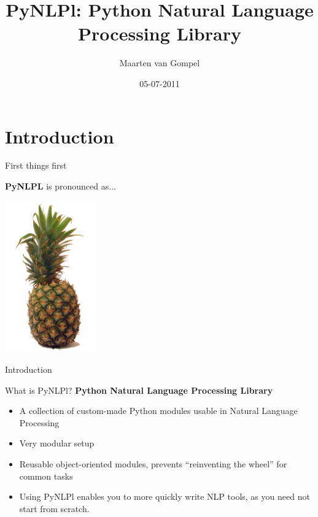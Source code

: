 \documentclass[compress]{beamer}
\title{PyNLPl: Python Natural Language Processing Library}
\author{Maarten van Gompel}
\date{05-07-2011}
\begin{document}
\begin{frame}
	\titlepage\smallraccoon\ilkuvt
\end{frame}

\section{Introduction}

\begin{frame}{First things first}

    \textbf{PyNLPL} is pronounced as...
    \begin{center}
    \includegraphics[width=40.0mm]{pineapple.jpg}
    \end{center}

\end{frame}

\begin{frame}{Introduction}


    \begin{block}{What is PyNLPl?}
        \textbf{Python Natural Language Processing Library}
        
        
        
        \begin{itemize}
            \item A collection of custom-made Python modules usable in Natural Language Processing
            \item Very modular setup
            \item Reusable object-oriented modules, prevents ``reinventing the wheel'' for common tasks
            \item Using PyNLPl enables you to more quickly write NLP tools, as you need not start from scratch.
        \end{itemize}
        

    \end{block}

\end{frame}
\end{document}
